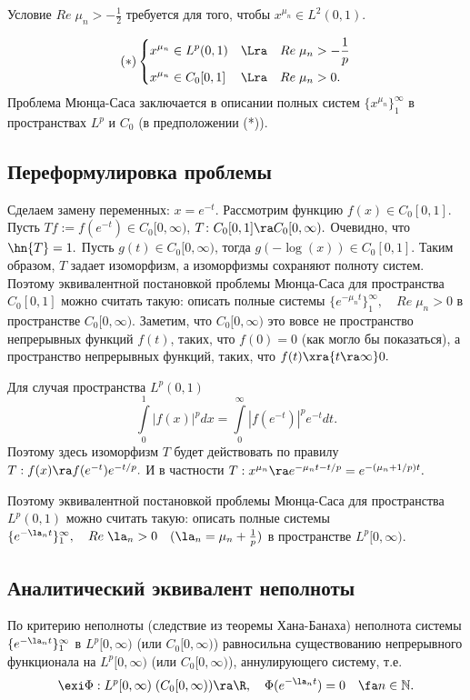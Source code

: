\documentclass{article}
\begin{document}
Условие $Re\;\mu_n>-\frac12$ требуется для того, чтобы
$x^{\mu_n}\in L^2(0,1).$

$$(*)\left\{
\begin{aligned}
&x^{\mu_n}\in L^p(0,1)&\Lra \quad&Re\;\mu_n>-\frac1p\\
&x^{\mu_n}\in C_0[0,1]&\Lra \quad&Re\;\mu_n>0.
\end{aligned}
\right.
$$
Проблема Мюнца-Саса заключается в описании полных систем
$\{x^{\mu_n}\}_1^{\infty}$ в пространствах $L^p$ и $C_0$ (в
предположении (*)).

\subsection{Переформулировка проблемы}
Сделаем замену переменных: $x=e^{-t}$. Рассмотрим функцию $f(x)\in
C_0[0,1].$ Пусть $Tf:=f(e^{-t})\in C_0[0,\infty)$, $T\colon
C_0[0,1]\ra C_0[0,\infty).$ Очевидно, что $\hn{T}=1.$
Пусть $g(t)\in C_0[0,\infty)$, тогда $g(-\log(x))\in C_0[0,1].$
Таким образом, $T$ задает изоморфизм, а изоморфизмы сохраняют
полноту систем. Поэтому эквивалентной постановкой проблемы
Мюнца-Саса для пространства $C_0[0,1]$ можно считать такую:
описать полные системы $\{e^{-\mu_n t}\}_1^{\infty},\quad
Re\;\mu_n>0$ в пространстве $C_0[0,\infty).$ Заметим, что
$C_0[0,\infty)$ это вовсе не пространство непрерывных функций
$f(t)$, таких, что $f(0)=0$ (как могло бы показаться), а
пространство непрерывных функций, таких, что
$f(t)\xra{t\ra\infty}0.$

Для случая пространства $L^p(0,1)$
$$\int\limits_0^1|f(x)|^pdx=\int\limits_0^{\infty}|f(e^{-t})|^pe^{-t}dt.$$
Поэтому здесь изоморфизм $T$ будет действовать по правилу
$T:f(x)\ra f(e^{-t})e^{-t/p}.$ И в частности $T:
x^{\mu_n}\ra e^{-\mu_n t-t/p}=e^{-(\mu_n+1/p)t}.$

Поэтому эквивалентной постановкой проблемы Мюнца-Саса для
пространства $L^p(0,1)$ можно считать такую: описать полные
системы $\{e^{-\la_n t}\}_1^{\infty},\quad
Re\;\la_n>0\quad(\la_n=\mu_n+\frac1p)$ в пространстве
$L^p[0,\infty).$

\subsection{Аналитический эквивалент неполноты}
По критерию неполноты (следствие из теоремы Хана-Банаха) неполнота
системы $\{e^{-\la_n t}\}_1^{\infty}$ в $L^p[0,\infty)$
(или $C_0[0,\infty)$) равносильна существованию непрерывного
функционала на $L^p[0,\infty)$ (или $C_0[0,\infty)$), аннулирующего
систему, т.е.
$$\exi \Phi:L^p[0,\infty)\; (C_0[0,\infty))\ra
\R ,\quad \Phi(e^{-\la_n t})=0\quad\fa
n\in\mathbb{N}.$$
\end{document}
